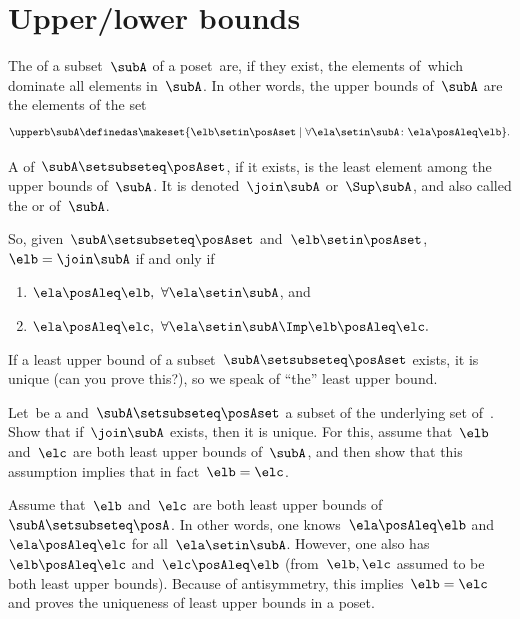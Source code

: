 \section{Upper/lower bounds}
\begin{ctdefinition}
    \label{def:least-upper-bound}
    \label{def:upper-bounds}
    The  of a subset~$\subA$ of a poset~\posA are, if they exist, the elements of~\posA which dominate all elements in~$\subA$.
    In other words, the upper bounds of~$\subA$ are the elements of the set
    \begin{equation}
        \upperb \subA\definedas \makeset{ \elb \setin \posAset \mid \forall \ela \setin \subA \colon \ela \posAleq \elb }.
    \end{equation}
\end{ctdefinition}

\begin{ctdefinition}\label{def:supremum}
    A  of~$\subA \setsubseteq \posAset$, if it exists, is the least element among the upper bounds of~$\subA$.
    It is denoted~$\join \subA$ or~$\Sup\subA$, and also called the  or  of~$\subA$.
\end{ctdefinition}

So, given~$\subA \setsubseteq \posAset$ and~$\elb \setin \posAset$,~$\elb = \join \subA$ if and only if
\begin{enumerate}
    \item $\ela \posAleq \elb, \ \forall \ela \setin \subA$, and
    \item $\ela \posAleq \elc, \ \forall \ela \setin \subA \Imp \elb \posAleq \elc.
          $
\end{enumerate}

If a least upper bound of a subset~$\subA \setsubseteq \posAset$ exists, it is unique (can you prove this?), so we speak of ``the'' least upper bound.

\begin{exercise}
    Let~\posA be a  and~$\subA \setsubseteq \posAset$ a subset of the underlying set of~\posA.
    Show that if~$\join \subA$ exists, then it is unique.
    For this, assume that~$\elb$ and~$\elc$ are both least upper bounds of~$\subA$, and then show that this assumption implies that in fact~$\elb = \elc$.
\end{exercise}
\begin{solution}
    Assume that~$\elb$ and~$\elc$ are both least upper bounds of~$\subA \setsubseteq \posA$.
    In other words, one knows~$\ela \posAleq \elb$ and~$\ela\posAleq \elc$ for all~$\ela\setin \subA$.
    However, one also has~$\elb\posAleq \elc$ and~$\elc\posAleq \elb$ (from~$\elb,\elc$ assumed to be both least upper bounds).
    Because of antisymmetry, this implies~$\elb=\elc$ and proves the uniqueness of least upper bounds in a poset.
\end{solution}

